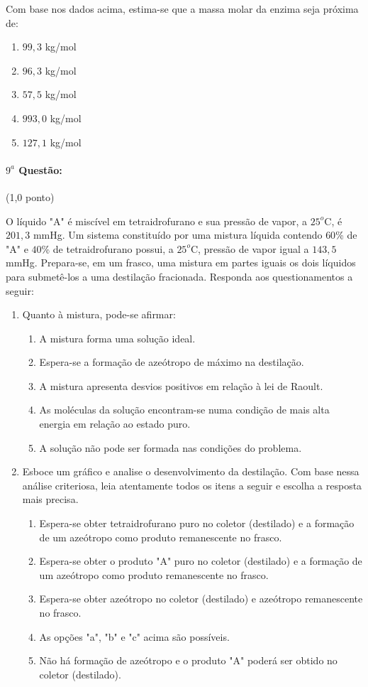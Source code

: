 \documentclass[12pt,a4paper]{article}
\begin{document}
 Com base nos dados acima, estima-se que a massa molar da enzima seja próxima de:
 \begin{enumerate}[label=\alph*)]
 \item $99,3$ kg/mol
 \item $96,3$ kg/mol
 \item $57,5$ kg/mol
 \item $993,0$ kg/mol
 \item $127,1$ kg/mol
 \end{enumerate}
 \paragraph{$9^a$ Questão:} (1,0 ponto)

O líquido "A" é miscível em tetraidrofurano e sua pressão de vapor, a $25^o$C, é $201,3$ mmHg. Um sistema constituído por uma mistura
líquida contendo $60$\% de "A" e $40$\% de tetraidrofurano possui, a $25^o$C, pressão de vapor igual a $143,5$ mmHg. Prepara-se, em um frasco,
uma mistura em partes iguais os dois líquidos para submetê-los a uma destilação fracionada. Responda aos questionamentos a seguir:

\begin{enumerate}[label=\Roman*-]
\item Quanto à mistura, pode-se afirmar:
\begin{enumerate}[label=\alph*)]
\item A mistura forma uma solução ideal.
\item Espera-se a formação de azeótropo de máximo na destilação.
\item A mistura apresenta desvios positivos em relação à lei de Raoult.
\item As moléculas da solução encontram-se numa condição de mais alta energia em relação ao estado puro.
\item A solução não pode ser formada nas condições do problema.
\end{enumerate}
\item Esboce um gráfico e analise o desenvolvimento da destilação. Com base nessa análise criteriosa, leia atentamente 
todos os itens a seguir e escolha a resposta mais precisa.
\begin{enumerate}[label=\alph*)]
\item Espera-se obter tetraidrofurano puro no coletor (destilado) e a formação de um azeótropo como produto remanescente no frasco.
\item Espera-se obter o produto "A" puro no coletor (destilado) e a formação de um azeótropo como produto remanescente no frasco.
\item Espera-se obter azeótropo no coletor (destilado) e azeótropo remanescente no frasco.
\item As opções "a", "b" e "c" acima são possíveis.
\item Não há formação de azeótropo e o produto "A" poderá ser obtido no coletor (destilado).
\end{enumerate}
\end{enumerate}
 
\end{document}
